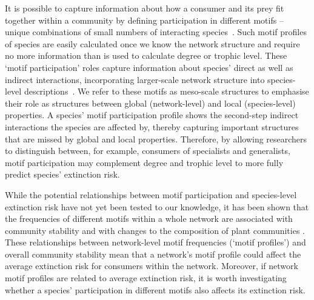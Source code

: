\documentclass[12pt]{article}
\begin{document}
\begin{spacing}{2.0}
    It is possible to capture information about how a consumer and its prey fit together within a community by defining participation in different motifs -- unique combinations of small numbers of interacting species~\citep{Stouffer2007,Stouffer2012}. 
    Such motif profiles of species are easily calculated once we know the network structure and require no more information than is used to calculate degree or trophic level.
    These `motif participation' roles capture information about species' direct as well as indirect interactions, incorporating larger-scale network structure into species-level descriptions~\citep{Cirtwill2015a,Cirtwill2018FoodWebs}.
    We refer to these motifs as meso-scale structures to emphasise their role as structures between global (network-level) and local (species-level) properties.  
    A species' motif participation profile shows the second-step indirect interactions the species are affected by, thereby capturing important structures that are missed by global and local properties.  
    Therefore, by allowing researchers to distinguish between, for example, consumers of specialists and generalists, motif participation may complement degree and trophic level to more fully predict species' extinction risk.
    

    While the potential relationships between motif participation and species-level extinction risk have not yet been tested to our knowledge, it has been shown that the frequencies of different motifs within a whole network are associated with community stability \citep{prill2005dynamic, bascompte2005simple} and with changes to the composition of plant communities \citep{giling2019plant}. 
    These relationships between network-level motif frequencies (`motif profiles') and overall community stability mean that a network's motif profile could affect the average extinction risk for consumers within the network.
    Moreover, if network motif profiles are related to average extinction risk, it is worth investigating whether a species' participation in different motifs also affects its extinction risk.


\end{spacing}
\end{document}
